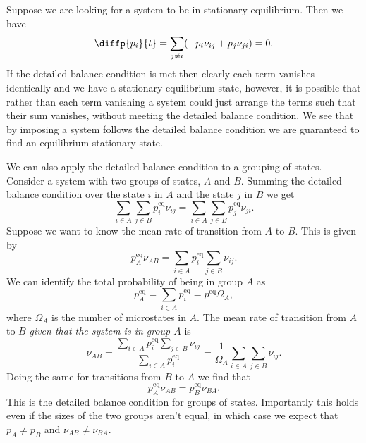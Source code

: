 \documentclass[fleqn]{NotesClass}
\begin{document}
    Suppose we are looking for a system to be in stationary equilibrium.
    Then we have
    \begin{equation}
        \diffp{p_i}{t} = \sum_{j \ne i} (-p_i\nu_{ij} + p_j\nu_{ji}) = 0.
    \end{equation}
    If the detailed balance condition is met then clearly each term vanishes identically and we have a stationary equilibrium state, however, it is possible that rather than each term vanishing a system could just arrange the terms such that their sum vanishes, without meeting the detailed balance condition.
    We see that by imposing a system follows the detailed balance condition we are guaranteed to find an equilibrium stationary state.
    
    We can also apply the detailed balance condition to a grouping of states.
    Consider a system with two groups of states, \(A\) and \(B\).
    Summing the detailed balance condition over the state \(i\) in \(A\) and the state \(j\) in \(B\) we get
    \begin{equation}
        \sum_{i \in A} \sum_{j \in B} p_i^{\mathrm{eq}} \nu_{ij} = \sum_{i \in A} \sum_{j \in B} p_j^{\mathrm{eq}} \nu_{ji}.
    \end{equation}
    Suppose we want to know the mean rate of transition from \(A\) to \(B\).
    This is given by
    \begin{equation}
        p_A^{\mathrm{eq}}\nu_{AB} = \sum_{i \in A} p_i^{\mathrm{eq}} \sum_{j \in B} \nu_{ij}.
    \end{equation}
    We can identify the total probability of being in group \(A\) as
    \begin{equation}
        p_A^{\mathrm{eq}} = \sum_{i \in A} p_i^{\mathrm{eq}} = p^{\mathrm{eq}}\Omega_A,
    \end{equation}
    where \(\Omega_A\) is the number of microstates in \(A\).
    The mean rate of transition from \(A\) to \(B\) \emph{given that the system is in group \(A\)} is
    \begin{equation}
        \nu_{AB} = \frac{\sum_{i\in A} p_i^{\mathrm{eq}} \sum_{j\in B}\nu_{ij}}{\sum_{i\in A}p_i^{\mathrm{eq}}} = \frac{1}{\Omega_A} \sum_{i \in A} \sum_{j \in B} \nu_{ij}.
    \end{equation}
    Doing the same for transitions from \(B\) to \(A\) we find that
    \begin{equation}
        p_A^{\mathrm{eq}}\nu_{AB} = p_B^{\mathrm{eq}}\nu_{BA}.
    \end{equation}
    This is the detailed balance condition for groups of states.
    Importantly this holds even if the sizes of the two groups aren't equal, in which case we expect that \(p_A \ne p_B\) and \(\nu_{AB} \ne \nu_{BA}\).
    
\end{document}
